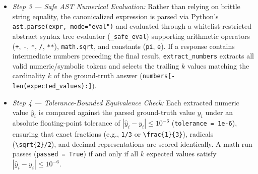 \documentclass[a4paper,fleqn]{cas-sc}
\begin{document}
\begin{enumerate}
\begin{itemize}
\item \emph{Step 3 --- Safe AST Numerical Evaluation:} Rather than relying on brittle string equality, the canonicalized expression is parsed via Python's \texttt{ast.parse(expr, mode="eval")} and evaluated through a whitelist-restricted abstract syntax tree evaluator (\texttt{\_safe\_eval}) supporting arithmetic operators (\texttt{+}, \texttt{-}, \texttt{*}, \texttt{/}, \texttt{**}), \texttt{math.sqrt}, and constants (\texttt{pi}, \texttt{e}). If a response contains intermediate numbers preceding the final result, \texttt{extract\_numbers} extracts all valid numeric/symbolic tokens and selects the trailing $k$ values matching the cardinality $k$ of the ground-truth answer (\texttt{numbers[-len(expected\_values):]}).
\item \emph{Step 4 --- Tolerance-Bounded Equivalence Check:} Each extracted numeric value $\hat{y}_i$ is compared against the parsed ground-truth value $y_i$ under an absolute floating-point tolerance of $|\hat{y}_i - y_i| \le 10^{-6}$ (\texttt{tolerance = 1e-6}), ensuring that exact fractions (e.g., \texttt{1/3} or \texttt{\textbackslash frac\{1\}\{3\}}), radicals (\texttt{\textbackslash sqrt\{2\}/2}), and decimal representations are scored identically. A math run passes (\texttt{passed = True}) if and only if all $k$ expected values satisfy $|\hat{y}_i - y_i| \le 10^{-6}$.
\end{itemize}
\end{enumerate}
\end{document}
